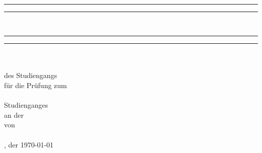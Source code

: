 \begin{titlepage}
	\thispagestyle{empty}
    \begin{center}
        \begin{minipage}{6in}
            \centering
            \hfill
        \end{minipage}
        \vspace{1cm}
        \\
        \rule{\textwidth}{1.6pt}\vspace*{-\baselineskip}\vspace*{2pt}
        \rule{\textwidth}{0.4pt}
        \\[0.2\baselineskip]
        {\LARGE \myTitle}
        \rule{\textwidth}{0.4pt}\vspace*{-\baselineskip}\vspace{3.2pt}
        \rule{\textwidth}{1.6pt}
        \\
        \vspace*{12mm}	{\large \myDokumententyp}\\
        \ifx\myBachelorart\undefinde
            \vspace*{27mm}	des Studiengangs \myStudiengang\\
        \else
            \vspace*{12mm}	für die Prüfung zum\\
            \vspace*{3mm} 	{\large \myBachelorart}\\
            \vspace*{12mm}	Studienganges \myStudiengang\\
        \fi
        \vspace*{3mm} 	an der \myHochschule\\
        \vspace*{12mm}	von\\
        \vspace*{3mm} 	{\large \myStudentenname}\\
        \vspace*{12mm}	{\todaysname}, der {\today} \\
      \end{center}


\end{titlepage}
